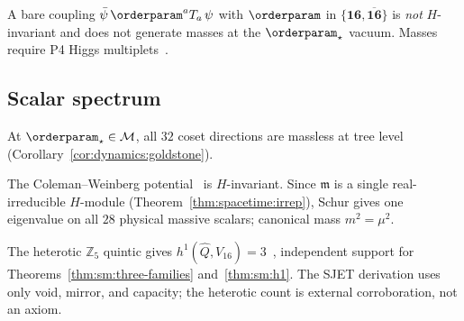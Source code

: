 \begin{remark}
A bare coupling $\bar\psi\,\orderparam^a T_a\,\psi$ with $\orderparam$ in
$\{\mathbf{16},\overline{\mathbf{16}}\}$ is \emph{not} $H$-invariant and does not
generate masses at the $\orderparam_\star$ vacuum. Masses require P4 Higgs
multiplets~\cite{GeorgiGlashow1974}.
\end{remark}

\subsection{Scalar spectrum}
\label{sec:sm:masses}

\begin{theorem}\label{thm:sm:tree}
At $\orderparam_\star\in\mathcal{M}$, all $32$ coset directions are massless at
tree level (Corollary~\ref{cor:dynamics:goldstone}).
\end{theorem}

\begin{theorem}\label{thm:sm:radiative}
The Coleman--Weinberg potential~\cite{ColemanWeinberg1973} is $H$-invariant.
Since $\mathfrak{m}$ is a single real-irreducible $H$-module
(Theorem~\ref{thm:spacetime:irrep}), Schur gives one eigenvalue on all $28$
physical massive scalars; canonical mass $m^2=\mu^2$.
\end{theorem}

\begin{remark}\label{rem:sm:heterotic}
The heterotic $\mathbb{Z}_5$ quintic gives $h^1(\hat Q,V_{16})=3$~\cite{Witten1985},
independent support for Theorems~\ref{thm:sm:three-families}
and~\ref{thm:sm:h1}. The SJET derivation uses only void, mirror, and capacity;
the heterotic count is external corroboration, not an axiom.
\end{remark}